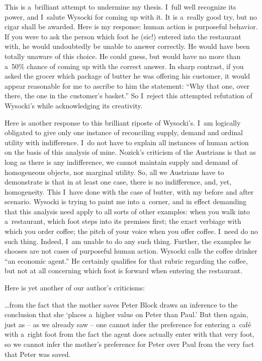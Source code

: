 This is a~brilliant attempt to undermine my thesis. I~full well recognize its power, and I~salute Wysocki for coming up with it. It is a~really good try, but no cigar shall be awarded. Here is my response: human action is purposeful behavior. If you were to ask the person which foot he (sic!) entered into the restaurant with, he would undoubtedly be unable to answer correctly. He would have been totally unaware of this choice. He could guess, but would have no more than a~50\% chance of coming up with the correct answer. In sharp contrast, if you asked the grocer which package of butter he was offering his customer, it would appear reasonable for me to ascribe to him the statement: ``Why that one, over there, the one in the customer's basket.'' So I~reject this attempted refutation of Wysocki's while acknowledging its creativity.



Here is another response to this brilliant riposte of Wysocki's. I~am logically obligated to give only one instance of reconciling supply, demand and ordinal utility with indifference. I~do not have to explain all instances of human action on the basis of this analysis of mine. Nozick's criticism of the Austrians is that as long as there is any indifference, we cannot maintain supply and demand of homogeneous objects, nor marginal utility. So, all we Austrians have to demonstrate is that in at least one case, there is no indifference, and, yet, homogeneity. This I~have done with the case of butter, with my before and after scenario. Wysocki is trying to paint me into a~corner, and in effect demanding that this analysis need apply to all sorts of other examples: when you walk into a~restaurant, which foot steps into its premises first; the exact verbiage with which you order coffee; the pitch of your voice when you offer coffee. I~need do no such thing. Indeed, I~am unable to do any such thing. Further, the examples he chooses are not cases of purposeful human action. Wysocki calls the coffee drinker ``an economic agent.'' He certainly qualifies for that rubric regarding the coffee, but not at all concerning which foot is forward when entering the restaurant.



Here is yet another of our author's criticisms:



…from the fact that the mother saves Peter Block draws an inference to the conclusion that she ‘places a~higher value on Peter than Paul.' But then again, just as -- as we already saw -- one cannot infer the preference for entering a~café with a~right foot from the fact the agent does actually enter with that very foot, so we cannot infer the mother's preference for Peter over Paul from the very fact that Peter was saved.



